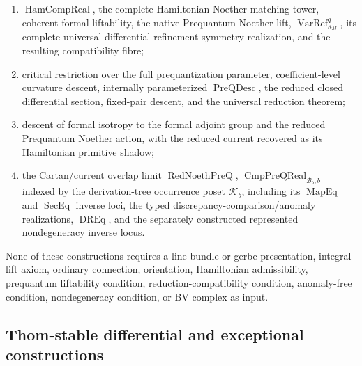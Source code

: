 \begin{enumerate}
\item $\operatorname{HamCompReal}$, the complete Hamiltonian-Noether matching
      tower, coherent formal liftability, the native Prequantum Noether lift,
      $\operatorname{VarRef}_{\kappa_M}^q$, its complete universal
      differential-refinement symmetry realization, and the resulting
      compatibility fibre;
\item critical restriction over the full prequantization parameter,
      coefficient-level curvature descent, internally parameterized
      $\operatorname{PreQDesc}$, the reduced closed differential section, fixed-pair
      descent, and the universal reduction theorem;
\item descent of formal isotropy to the formal adjoint group and the reduced
      Prequantum Noether action, with the reduced current recovered as its
      Hamiltonian primitive shadow;
\item the Cartan/current overlap limit $\operatorname{RedNoethPreQ}$,
      $\operatorname{CmpPreQReal}_{\mathcal B_b,b}$ indexed by
      the derivation-tree occurrence poset $\mathcal K_b$, including its
      $\operatorname{MapEq}$ and $\operatorname{SecEq}$ inverse loci, the typed
      discrepancy-comparison/anomaly realizations, $\operatorname{DREq}$, and the
      separately constructed represented nondegeneracy inverse locus.
\end{enumerate}
None of these constructions requires a line-bundle or gerbe presentation,
integral-lift axiom, ordinary connection, orientation, Hamiltonian admissibility,
prequantum liftability condition, reduction-compatibility condition, anomaly-free
condition, nondegeneracy condition, or BV complex as input.

\subsection{Thom-stable differential and exceptional constructions}
\label{subsec:prequantum-audit-differential-umkehr}


